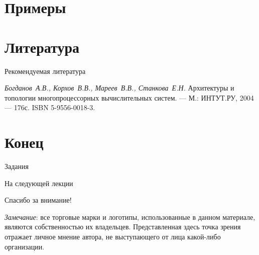 \section{Примеры}

\section{Литература}

\begin{frame}[allowframebreaks]{Рекомендуемая литература}
\begin{thebibliography}{99}
    \bibitem{} \textit{Богданов~А.В., Корхов~В.В., Мареев~В.В., Станкова~Е.Н.}
    Архитектуры и топологии многопроцессорных вычислительных систем. --- М.:
    ИНТУТ.РУ, 2004 --- 176с. ISBN 5-9556-0018-3.
\end{thebibliography}
\end{frame}

\section*{Конец}

\begin{frame}{Задания}
\end{frame}

\begin{frame}{На следующей лекции}
\end{frame}

\begin{frame}

{\huge{Спасибо за внимание!}\par}

\vfill

\tiny{\textit{Замечание}: все торговые марки и логотипы, использованные в данном материале, являются собственностью их владельцев. Представленная здесь точка зрения отражает личное мнение автора, не выступающего от лица какой-либо организации.}

\end{frame}


